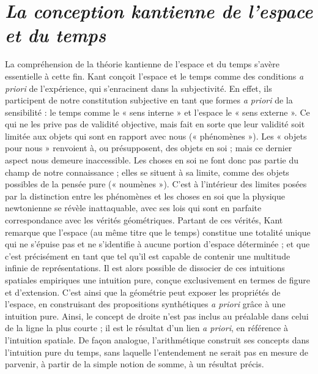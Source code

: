 
\section{{\it La conception kantienne de l’espace et du temps}}

La compréhension de la théorie kantienne
de l’espace et du temps s’avère
essentielle à cette fin. Kant conçoit l’espace
et le temps comme des conditions {\it a
priori} de l’expérience, qui s’enracinent
dans la subjectivité. En effet, ils participent
de notre constitution subjective en
tant que formes {\it a priori} de la sensibilité :
le temps comme le « sens interne » et l’espace
le « sens externe ». Ce qui ne les
prive pas de validité objective, mais fait
en sorte que leur validité soit limitée aux
objets qui sont en rapport avec nous
(« phénomènes »). Les « objets pour
nous » renvoient à, ou présupposent, des
objets en soi ; mais ce dernier aspect nous
demeure inaccessible. Les choses en soi
ne font donc pas partie du champ de notre
connaissance ; elles se situent à sa limite,
comme des objets possibles de la pensée
pure (« noumènes »). C’est à l’intérieur
des limites posées par la distinction entre
les phénomènes et les choses en soi que
la physique newtonienne se révèle inattaquable,
avec ses lois qui sont en parfaite
correspondance avec les vérités géométriques.
Partant de ces vérités, Kant
remarque que l’espace (au même titre
que le temps) constitue une totalité
unique qui ne s’épuise pas et ne s’identifie
à aucune portion d’espace déterminée ; et
que c’est précisément en tant que tel qu’il
est capable de contenir une multitude infinie
de représentations. Il est alors possible
de dissocier de ces intuitions
spatiales empiriques une intuition pure,
conçue exclusivement en termes de figure
et d'extension. C’est ainsi que la géométrie
peut exposer les propriétés de l’espace,
en construisant des propositions
synthétiques {\it a priori} grâce à une intuition
pure. Ainsi, le concept de droite n’est pas
inclus au préalable dans celui de la ligne
la plus courte ; il est le résultat d’un lien
{\it a priori}, en référence à l’intuition spatiale.
De façon analogue, l’arithmétique
construit ses concepts dans l'intuition
pure du temps, sans laquelle l’entendement
ne serait pas en mesure de parvenir,
à partir de la simple notion de somme, à
un résultat précis.

